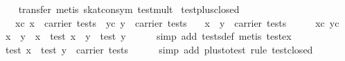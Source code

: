 \begin{isabellebody}
%
\isadelimproof
\ \ %
\endisadelimproof
%
\isatagproof
{}\isamarkupfalse%
\ {}transfer{}\ metis\ skat{}con{}sym\ test{}mult{}%
\endisatagproof
{\isafoldproof}%
%
\isadelimproof
\isanewline
%
\endisadelimproof
\isanewline
{}\isamarkupfalse%
\ test{}plus{}closed{}\isanewline
\ \ \ xc{}\ {}x\ {}\ carrier\ tests{}\ \ yc{}\ {}y\ {}\ carrier\ tests{}\isanewline
\ \ \ {}x\ {}\ y\ {}\ carrier\ tests{}\isanewline
%
\isadelimproof
%
\endisadelimproof
%
\isatagproof
{}\isamarkupfalse%
\ {}\isanewline
\ \ \isamarkupfalse%
\ xc\ yc\ \isamarkupfalse%
\ x{}\ \ y{}\ \ {}x\ {}\ test\ x{}{}\ \ {}y\ {}\ test\ y{}{}\isanewline
\ \ \ \ \isamarkupfalse%
\ {}simp\ add{}\ tests{}def{}\ metis\ test{}ex{}\isanewline
\ \ \isamarkupfalse%
\ \isamarkupfalse%
\ {}test\ x{}\ {}\ test\ y{}\ {}\ carrier\ tests{}\isanewline
\ \ \ \ \isamarkupfalse%
\ {}simp\ add{}\ plus{}to{}test{}\ rule\ test{}closed{}\isanewline

\end{isabellebody}
